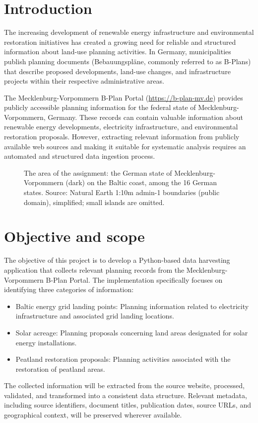 \documentclass[11pt,a4paper]{article}
\begin{document}
\newpage 


\section{Introduction}
The increasing development of renewable energy infrastructure and environmental restoration initiatives has created a growing need for reliable and structured information about land-use planning activities. In Germany, municipalities publish planning documents (Bebauungspläne, commonly referred to as B-Plans) that describe proposed developments, land-use changes, and infrastructure projects within their respective administrative areas.

The Mecklenburg-Vorpommern B-Plan Portal (\url{https://b-plan-mv.de}) provides publicly accessible planning information for the federal state of Mecklenburg-Vorpommern, Germany. These records can contain valuable information about renewable energy developments, electricity infrastructure, and environmental restoration proposals. However, extracting relevant information from publicly available web sources and making it suitable for systematic analysis requires an automated and structured data ingestion process.
%
\begin{figure}[h]
	\centering
	
	\caption{The area of the assignment: the German state of Mecklenburg-Vorpommern (dark) on the Baltic coast, among the 16
		German states. Source: Natural Earth 1:10m admin-1 boundaries (public domain), simplified; small islands are omitted.}
	\label{fig:mv-map}
\end{figure}
\section{Objective and scope}\label{sec:objective}
The objective of this project is to develop a Python-based data harvesting application that collects relevant planning records from the Mecklenburg-Vorpommern B-Plan Portal. The implementation specifically focuses on identifying three categories of information:
\begin{itemize}
	\item Baltic energy grid landing points: Planning information related to electricity infrastructure and associated grid landing locations.
	\item Solar acreage: Planning proposals concerning land areas designated for solar energy installations.
	\item Peatland restoration proposals: Planning activities associated with the restoration of peatland areas.
\end{itemize}
%
The collected information will be extracted from the source website, processed, validated, and transformed into a consistent data structure. Relevant metadata, including source identifiers, document titles, publication dates, source URLs, and geographical context, will be preserved wherever available.
\end{document}
